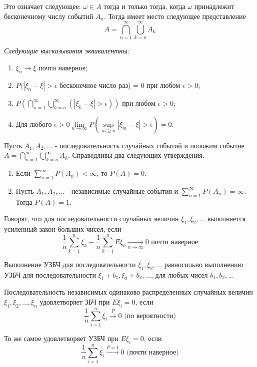Это означает следующее: $\omega \in A$ тогда и только тогда, когда $\omega$ принадлежит бесконечному числу событий $A_n$. Тогда имеет место следующее представление
\[ A = \bigcap_{n=1}^{\infty} \bigcup_{k=n}^{\infty} A_k \]

\textit{Следующие высказывания эквивалентны:}

\begin{enumerate}
	\item $\xi_n \to \xi$ почти наверное;
	\item $P(|\xi_n - \xi| > \epsilon$ бесконечное число раз) = 0 при любом $\epsilon > 0$;
	\item $P \left( \bigcap\limits_{n=1}^{\infty} \bigcup\limits_{k=n}^{\infty} (|\xi_k - \xi| > \epsilon) \right)$ при любом $\epsilon > 0$;
	\item Для любого $\epsilon > 0 \lim\limits_{n \to \infty} P(\sup\limits_{m \ge n} |\xi_m - \xi| > \epsilon) = 0$.
\end{enumerate}

\begin{lemma}
	Пусть $A_1, A_2, \dots$ - последовательность случайных событий и положим событие $A = \bigcap\limits_{n=1}^{\infty} \bigcup\limits_{k=n}^{\infty} A_k $. Справедливы два следующих утверждения.
	\begin{enumerate}
		\item Если $\sum\limits_{n=1}^{\infty} P(A_n) < \infty$, то $P(A) = 0$.
		\item Пусть $A_1, A_2, \dots$ - независимые случайные события и $\sum\limits_{n=1}^{\infty} P(A_n) = \infty$. Тогда $P(A) = 1$.
	\end{enumerate}
\end{lemma}

\begin{definition}
	Говорят, что для последовательности случайных величин $\xi_1, \xi_2, \dots$ выполняется усиленный закон больших чисел, если
	\[ \frac{1}{n} \sum_{k=1}^{n} \xi_k - \frac{1}{n} \sum_{k=1}^{n} E \xi_k \underset{n \to \infty}{\to} 0 \text{ почти наверное} \]
\end{definition}
\begin{remark}
	Выполнение УЗБЧ для последовательности $\xi_1, \xi_2, \dots$ равносильно выполнению УЗБЧ для последовательности $\xi_1 + b_1, \xi_2 + b_2, \dots$, для любых чисел $b_1, b_2, \dots$
\end{remark}


\begin{definition}[ЗБЧ при $E\xi_i=0$]
	Последовательность независимых одинаково распределенных случайных величин $\xi_1,\xi_2,\dots,\xi_n$ удовлетворяет ЗБЧ при $E\xi_i=0$, если
	\[\dfrac{1}{n} \sum\limits_{i=1}^n \xi_i \overset{P}{\to} 0 \text{ (по вероятности)}\]
\end{definition}
\begin{definition}[УЗБЧ при $E\xi_i=0$]
	То же самое удовлетворяет УЗБЧ при $E\xi_i=0$, если
	\[\dfrac{1}{n} \sum\limits_{i=1}^n \xi_i \overset{P=1}{\to} 0 \text{ (почти наверное)} \]
\end{definition}

